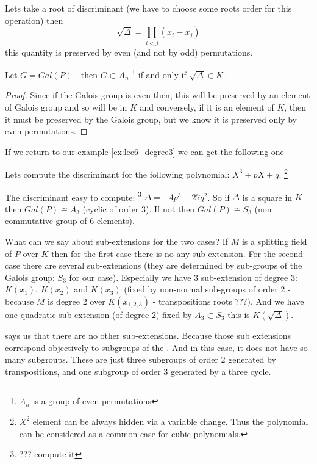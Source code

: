 Lets take a root of discriminant (we have to choose some roots order
for this operation) then
\[
\sqrt{\Delta} = \prod_{i < j} \left(x_i - x_j\right)
\]
this quantity is preserved by even (and not by odd) permutations.

\begin{proposition}
  Let $G = Gal\left(P\right)$ -  then $G
  \subset A_n$
  \footnote {
    $A_n$ is a group of even permutations
  }
  if and only if $\sqrt{\Delta} \in K$.
  \begin{proof}
    Since if the Galois group is even then, this will be preserved by
    an element of Galois group and so will be in $K$ and conversely, if
    it is an element of $K$, then it must be preserved by the Galois
    group, but we know it is preserved only by even permutations. 
  \end{proof}
  \label{prop:lec6_1}
\end{proposition}

If we return to our example \ref{ex:lec6_degree3} we can get the
following one
\begin{example}
  Lets compute the discriminant for the following polynomial:
  $X^3 + p X + q$.
  \footnote {
    $X^2$ element can be always hidden via a variable change. Thus the
    polynomial can be considered as a common case for cubic polynomials.
  }

  The discriminant easy to compute:
  \footnote{
    ??? compute it
  }
  \(
  \Delta = -4 p^3 - 27 q^2
  \).
  So if $\Delta$ is a square in $K$ then $Gal\left(P\right) \cong A_3$
  (cyclic of order 3). If not then $Gal\left(P\right) \cong S_3$ (non
  commutative group of 6 elements).

  What can we say about sub-extensions for the two cases? If $M$ is a
  splitting field of $P$ over $K$ then for the first case there is no
  any sub-extension. For the second case there are several
  sub-extensions (they are determined by sub-groups of the Galois
  group: $S_3$ for our case). Especially we have 3 sub-extension of
  degree 3: $K\left(x_1\right)$, $K\left(x_2\right)$ and
  $K\left(x_3\right)$ (fixed by non-normal sub-groups of order 2 -
  because $M$ is degree 2 over $K\left(x_{1,2,3}\right)$ -
  transpositions roots ???). And we have one quadratic sub-extension
  (of degree 2) fixed by $A_3 \subset S_3$ this is
  $K\left(\sqrt{\Delta}\right)$.

   says us that there are no other
  sub-extensions. Because those sub extensions correspond objectively
  to subgroups of the . And in this case, it
  does not have so many subgroups. These are just three subgroups of order 2
  generated by transpositions, and one subgroup of order 3 generated
  by a three cycle.  
  \label{ex:lec6_discriminant3degree}
\end{example}

